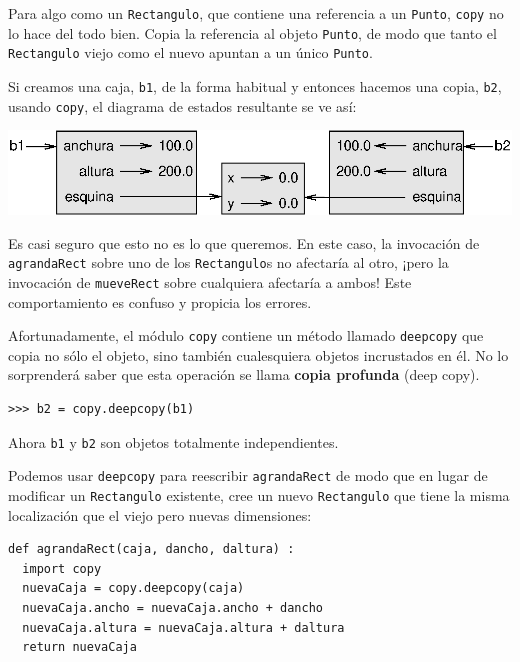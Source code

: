 Para algo como un \texttt{Rectangulo}, que contiene una referencia
a un \texttt{Punto}, \texttt{copy} no lo hace del todo bien. Copia
la referencia al objeto \texttt{Punto}, de modo que tanto el \texttt{Rectangulo}
viejo como el nuevo apuntan a un único \texttt{Punto}.

Si creamos una caja, \texttt{b1}, de la forma habitual y entonces
hacemos una copia, \texttt{b2}, usando \texttt{copy}, el diagrama
de estados resultante se ve así:

\beforefig \centerline{\includegraphics{illustrations/rectangle2}}
\afterfig

Es casi seguro que esto no es lo que queremos. En este caso, la invocación
de \texttt{agrandaRect} sobre uno de los \texttt{Rectangulo}s no afectaría
al otro, ¡pero la invocación de \texttt{mueveRect} sobre cualquiera
afectaría a ambos! Este comportamiento es confuso y propicia los errores.

Afortunadamente, el módulo \texttt{copy} contiene un método llamado
\texttt{deepcopy} que copia no sólo el objeto, sino también cualesquiera
objetos incrustados en él. No lo sorprenderá saber que esta operación
se llama \textbf{copia profunda} (deep copy).

\begin{lstlisting}
>>> b2 = copy.deepcopy(b1)
\end{lstlisting}
 Ahora \texttt{b1} y \texttt{b2} son objetos totalmente independientes.

Podemos usar \texttt{deepcopy} para reescribir \texttt{agrandaRect}
de modo que en lugar de modificar un \texttt{Rectangulo} existente,
cree un nuevo \texttt{Rectangulo} que tiene la misma localización
que el viejo pero nuevas dimensiones:

\begin{lstlisting}
def agrandaRect(caja, dancho, daltura) :
  import copy
  nuevaCaja = copy.deepcopy(caja)
  nuevaCaja.ancho = nuevaCaja.ancho + dancho
  nuevaCaja.altura = nuevaCaja.altura + daltura
  return nuevaCaja
\end{lstlisting}

